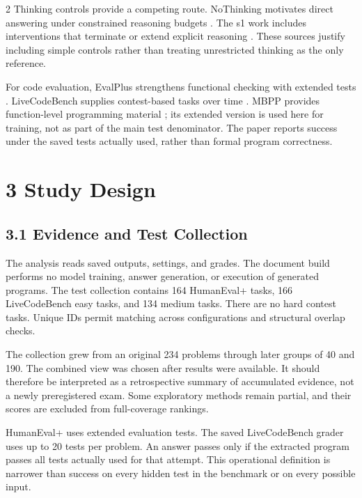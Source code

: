 \documentclass[11pt,letterpaper]{article}
\begin{document}
\begin{multicols}{2}
Thinking controls provide a competing route. NoThinking motivates direct answering under constrained reasoning budgets \cite{nothink}. The s1 work includes interventions that terminate or extend explicit reasoning \cite{s1}. These sources justify including simple controls rather than treating unrestricted thinking as the only reference.\par

For code evaluation, EvalPlus strengthens functional checking with extended tests \cite{evalplus}. LiveCodeBench supplies contest-based tasks over time \cite{lcb}. MBPP provides function-level programming material \cite{mbpp}; its extended version is used here for training, not as part of the main test denominator. The paper reports success under the saved tests actually used, rather than formal program correctness.\par

\section*{3 Study Design}

\subsection*{3.1 Evidence and Test Collection}

The analysis reads saved outputs, settings, and grades. The document build performs no model training, answer generation, or execution of generated programs. The test collection contains 164 HumanEval+ tasks, 166 LiveCodeBench easy tasks, and 134 medium tasks. There are no hard contest tasks. Unique IDs permit matching across configurations and structural overlap checks.\par

The collection grew from an original 234 problems through later groups of 40 and 190. The combined view was chosen after results were available. It should therefore be interpreted as a retrospective summary of accumulated evidence, not a newly preregistered exam. Some exploratory methods remain partial, and their scores are excluded from full-coverage rankings.\par

HumanEval+ uses extended evaluation tests. The saved LiveCodeBench grader uses up to 20 tests per problem. An answer passes only if the extracted program passes all tests actually used for that attempt. This operational definition is narrower than success on every hidden test in the benchmark or on every possible input.\par


\end{multicols}
\end{document}
